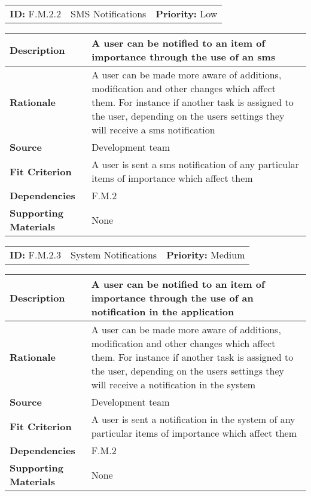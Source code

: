 \begin{table}[H]
    \begin{tabularx}{\textwidth}{| l | X | l |}
        \hline
        \textbf{ID:} F.M.2.2 & SMS Notifications & \textbf{Priority:} Low \\
    \end{tabularx}
    \begin{tabularx}{\textwidth}{| l | X |}
        \hline
        \textbf{Description} & A user can be notified to an item of importance through the use of an sms\\ \hline
        \textbf{Rationale} & A user can be made more aware of additions, modification and other changes which affect them. For instance if another task is assigned to the user, depending on the users settings they will receive a sms notification\\ \hline
        \textbf{Source} &  Development team\\ \hline
        \textbf{Fit Criterion} & A user is sent a sms notification of any particular items of importance which affect them  \\ \hline
        \textbf{Dependencies} & F.M.2 \\ \hline
        \textbf{Supporting Materials} & None \\ \hline
    \end{tabularx}
\end{table}

\begin{table}[H]
    \begin{tabularx}{\textwidth}{| l | X | l |}
        \hline
        \textbf{ID:} F.M.2.3 & System Notifications & \textbf{Priority:} Medium \\
    \end{tabularx}
    \begin{tabularx}{\textwidth}{| l | X |}
        \hline
        \textbf{Description} & A user can be notified to an item of importance through the use of an notification in the application\\ \hline
        \textbf{Rationale} & A user can be made more aware of additions, modification and other changes which affect them. For instance if another task is assigned to the user, depending on the users settings they will receive a notification in the system\\ \hline
        \textbf{Source} &  Development team\\ \hline
        \textbf{Fit Criterion} & A user is sent a notification in the system of any particular items of importance which affect them  \\ \hline
        \textbf{Dependencies} & F.M.2 \\ \hline
        \textbf{Supporting Materials} & None \\ \hline
    \end{tabularx}
\end{table}

